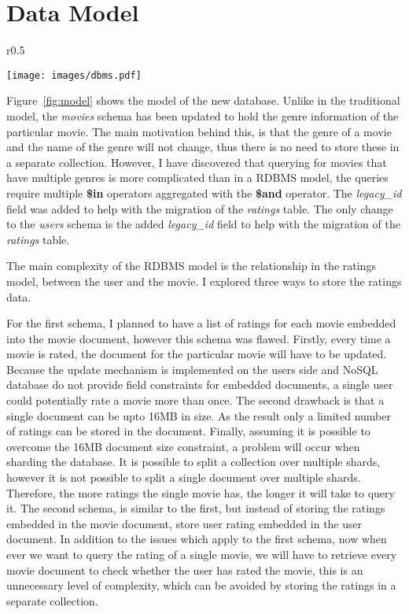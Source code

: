 \documentclass[a4paper, titlepage, 11pt]{article}
\begin{document}
\section{Data Model}
\begin{wrapfigure}{r}{0.5\textwidth}
  \begin{center}
      \texttt{[image: images/dbms.pdf]}
	  \caption{MongoDB schema model}
	  \label{fig:model}
  \end{center}
\end{wrapfigure}
Figure~\ref{fig:model} shows the model of the new database. Unlike in the traditional model, the \textit{movies} schema has been updated to hold the genre information of the particular movie. The main motivation behind this, is that the genre of a movie   and the name of the genre will not change, thus there is no need to store these in a separate collection. However, I have discovered that querying for movies that have multiple genres is more complicated than in a RDBMS model, the queries require multiple \textbf{\$in} operators aggregated with the \textbf{\$and} operator. The \textit{legacy\_id} field was added to help with the migration of the \textit{ratings} table. The only change to the \textit{users} schema is the added \textit{legacy\_id} field to help with the migration of the \textit{ratings} table.\par
The main complexity of the RDBMS model is the relationship in the ratings model, between the user and the movie. I explored three ways to store the ratings data. \par
For the first schema, I planned to have a list of ratings for each movie embedded into the movie document, however this schema was flawed. Firstly, every time a movie is rated, the document for the particular movie will have to be updated. Because the update mechanism is implemented on the users side and NoSQL database do not provide field constraints for embedded documents, a single user could potentially rate a movie more than once. The second drawback is that a single document can be upto 16MB in size. As the result only a limited number of ratings can be stored in the document. Finally, assuming it is possible to overcome the 16MB document size constraint, a problem will occur when sharding the database. It is possible to split a collection over multiple shards, however it is not possible to split a single document over multiple shards. Therefore, the more ratings the single movie has, the longer it will take to query it. The second schema, is similar to the first, but instead of storing the ratings embedded in the movie document, store user rating embedded in the user document. In addition to the issues which apply to the first schema, now when ever we want to query the rating of a single movie, we will have to retrieve every movie document to check whether the user has rated the movie, this is an unnecessary level of complexity, which can be avoided by storing the ratings in a separate collection.\par
\end{document}
